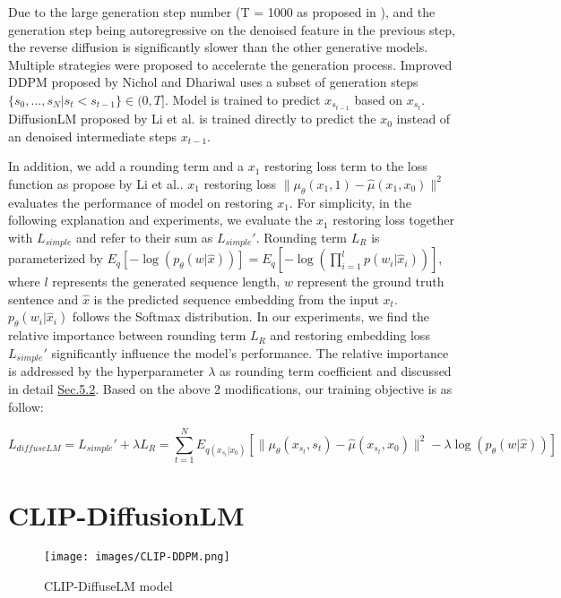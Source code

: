 \documentclass{article}
\begin{document}
Due to the large generation step number (T = 1000 as proposed in \cite{ddpm}), and the generation step being autoregressive on the denoised feature in the previous step, the reverse diffusion is significantly slower than the other generative models\cite{gan, vae}. Multiple strategies were proposed to accelerate the generation process. Improved DDPM proposed by Nichol and Dhariwal\cite{improved-ddpm} uses a subset of generation steps $\{s_0, ..., s_N | s_t < s_{t-1}\} \in (0, T]$. Model is trained to predict $x_{s_{t-1}}$ based on $x_{s_t}$. DiffusionLM proposed by Li et al.\cite{diffuselm} is trained directly to predict the $x_0$ instead of an denoised intermediate steps $x_{t-1}$.

In addition, we add a rounding term and a $x_1$ restoring loss term to the loss function as propose by Li et al.\cite{diffuselm}. $x_1$ restoring loss $\|\mu_{\theta}(x_1, 1) - \hat{\mu}(x_1, x_0)\|^2$ evaluates the performance of model on restoring $x_1$. For simplicity, in the following explanation and experiments, we evaluate the $x_1$ restoring loss together with $L_{simple}$ and refer to their sum as $L_{simple}'$. Rounding term $L_R$ is parameterized by $E_q[-\log(p_{\theta}(w | \hat{x}))] = E_q[-\log(\prod_{i=1}^l p(w_i | \hat{x}_i))]$, where $l$ represents the generated sequence length, $w$ represent the ground truth sentence and $\hat{x}$ is the predicted sequence embedding from the input $x_t$. $p_{\theta}(w_i | \hat{x}_i)$ follows the Softmax distribution. In our experiments, we find the relative importance between rounding term $L_R$ and restoring embedding loss $L_{simple}'$ significantly influence the model's performance. The relative importance is addressed by the hyperparameter $\lambda$ as rounding term coefficient and discussed in detail \hyperref[sec:lambda-exp]{Sec.5.2}. Based on the above 2 modifications, our training objective is as follow:

$$L_{diffuseLM} = L_{simple}' + \lambda L_R = \sum_{t=1}^{N} E_{q(x_{s_t} | x_0)} [\|\mu_{\theta}(x_{s_t}, s_t) - \hat{\mu}(x_{s_t}, x_0)\|^2 -\lambda\log(p_{\theta}(w | \hat{x}))]$$


\section{CLIP-DiffusionLM}
\label{sec:CLIP-DiffuseLM}
\begin{figure}
    \centering
    \texttt{[image: images/CLIP-DDPM.png]}
    \caption{CLIP-DiffuseLM model}
    \label{fig:model}
\end{figure}
\end{document}
